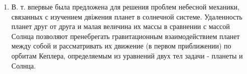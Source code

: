 \documentclass[10pt]{article}
\begin{document}
\begin{enumerate}

  \item В. т. впервые была предложена для решения проблем небесной механики, связанных с изучением двіжения планет в солнечной системе. Удаленность планет друг от друга и малая величина их массы в сравнении с массой Солнца позволяют пренебрегать гравитационным взаимодействием планет между собой и рассматривать их движение (в первом приближении) по орбитам Кеплера, определяемым из уравнений двух тел задачи - планеты и Солнца.

\end{enumerate}
\end{document}
